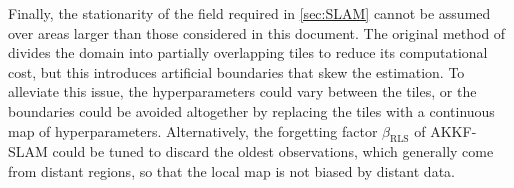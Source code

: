 Finally, the stationarity of the field required in \cref{sec:SLAM} cannot be assumed over areas larger than those considered in this document. The original method of \cite{bib:magnetic-SLAM-3D} divides the domain into partially overlapping tiles to reduce its computational cost, but this introduces artificial boundaries that skew the estimation. To alleviate this issue, the hyperparameters could vary between the tiles, or the boundaries could be avoided altogether by replacing the tiles with a continuous map of hyperparameters. Alternatively, the forgetting factor $\beta_{\mathrm{RLS}}$ of AKKF-SLAM could be tuned to discard the oldest observations, which generally come from distant regions, so that the local map is not biased by distant data.
